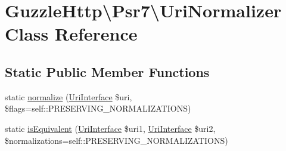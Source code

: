 \hypertarget{classGuzzleHttp_1_1Psr7_1_1UriNormalizer}{}\section{Guzzle\+Http\textbackslash{}Psr7\textbackslash{}Uri\+Normalizer Class Reference}
\label{classGuzzleHttp_1_1Psr7_1_1UriNormalizer}
\subsection*{Static Public Member Functions}
\begin{DoxyCompactItemize}
\item 
static \hyperlink{classGuzzleHttp_1_1Psr7_1_1UriNormalizer_aa0606a65d9e3406faf5953145597a227}{normalize} (\hyperlink{interfacePsr_1_1Http_1_1Message_1_1UriInterface}{Uri\+Interface} \$uri, \$flags=self\+::\+P\+R\+E\+S\+E\+R\+V\+I\+N\+G\+\_\+\+N\+O\+R\+M\+A\+L\+I\+Z\+A\+T\+I\+O\+NS)
\item 
static \hyperlink{classGuzzleHttp_1_1Psr7_1_1UriNormalizer_aafc6786d981cc772ce1cb14a1117da07}{is\+Equivalent} (\hyperlink{interfacePsr_1_1Http_1_1Message_1_1UriInterface}{Uri\+Interface} \$uri1, \hyperlink{interfacePsr_1_1Http_1_1Message_1_1UriInterface}{Uri\+Interface} \$uri2, \$normalizations=self\+::\+P\+R\+E\+S\+E\+R\+V\+I\+N\+G\+\_\+\+N\+O\+R\+M\+A\+L\+I\+Z\+A\+T\+I\+O\+NS)
\end{DoxyCompactItemize}
